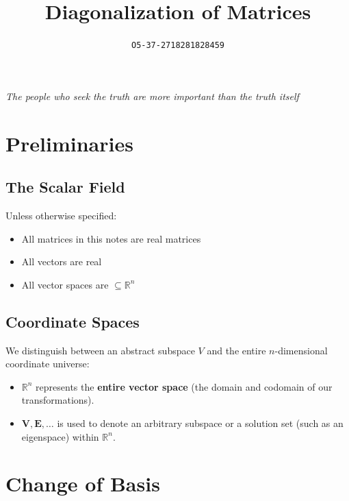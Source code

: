 \documentclass[11pt]{article}
\title{Diagonalization of Matrices}
\author{\texttt{O5-37-2718281828459}}
\newcommand{\mysubvecsp}[1]{\bm{{#1}}}
\begin{document}
    \maketitle

    \newpage
    \vspace*{\fill}
    \begin{center}
        \LARGE
        \selectfont\itshape
        The people who seek the truth are more important than the truth itself \\
    \end{center}
    {
        \Large
    }
    \vspace*{\fill}

    \newpage
    \tableofcontents
    
    \newpage
    \setcounter{section}{-1}
    \section{Preliminaries}
    \subsection{The Scalar Field}
    Unless otherwise specified:
    \begin{itemize}
        \item All matrices in this notes are real matrices
        \item All vectors are real
        \item All vector spaces are $\subseteq \mathbb{R}^n$
    \end{itemize}

    \subsection{Coordinate Spaces}
    We distinguish between an abstract subspace $V$ and the entire $n$-dimensional coordinate universe:
    \begin{itemize}
        \item $\mathbb{R}^n$ represents the \textbf{entire vector space} (the domain and codomain of our transformations).
        \item $\mysubvecsp{V}, \mysubvecsp{E}, \dots$ is used to denote an arbitrary subspace or a solution set (such as an eigenspace) within $\mathbb{R}^n$.
    \end{itemize}

    \newpage
    \section{Change of Basis}
\end{document}
